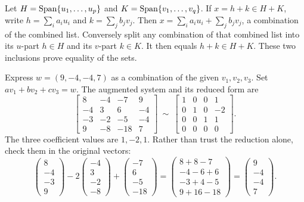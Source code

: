 Let $H=\operatorname{Span}\{u_1,\ldots,u_p\}$ and $K=\operatorname{Span}\{v_1,\ldots,v_q\}$.
If $x=h+k\in H+K$, write $h=\sum_i a_i u_i$ and $k=\sum_j b_jv_j$.
Then $x=\sum_i a_iu_i+\sum_jb_jv_j$, a combination of the combined list.
Conversely split any combination of that combined list into its $u$-part
$h\in H$ and its $v$-part $k\in K$. It then equals $h+k\in H+K$.
These two inclusions prove equality of the sets.

\goal Express $w=(9,-4,-4,7)$ as a combination of the given $v_1,v_2,v_3$.
Set $a v_1+b v_2+c v_3=w$. The augmented system and its reduced form are
\[
 \left[\begin{array}{rrr|r}
 8&-4&-7&9\\-4&3&6&-4\\-3&-2&-5&-4\\9&-8&-18&7
 \end{array}\right]\ \sim\
 \left[\begin{array}{rrr|r}1&0&0&1\\0&1&0&-2\\0&0&1&1\\0&0&0&0\end{array}\right].
\]
The three coefficient values are $1,-2,1$. Rather than trust the reduction
alone, check them in the original vectors:
\[
 \begin{pmatrix}8\\-4\\-3\\9\end{pmatrix}
 -2\begin{pmatrix}-4\\3\\-2\\-8\end{pmatrix}
 +\begin{pmatrix}-7\\6\\-5\\-18\end{pmatrix}
 =\begin{pmatrix}8+8-7\\-4-6+6\\-3+4-5\\9+16-18\end{pmatrix}
 =\begin{pmatrix}9\\-4\\-4\\7\end{pmatrix}.
\]

